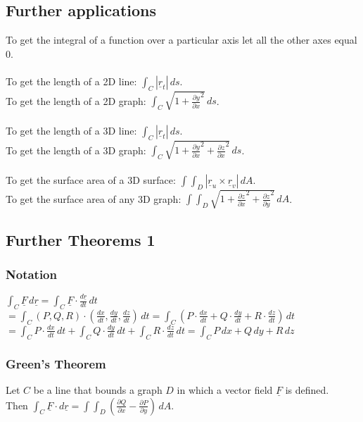 \documentclass{article}
\begin{document}
		\subsection{Further applications}
			To get the integral of a function over a particular axis let all the other axes equal 0. \\
			\\
			To get the length of a 2D line: $\int_C |\underline{r}_{t}| \,ds$. \\
			To get the length of a 2D graph: $\int_C \sqrt{1+\frac{\partial y}{\partial x}^2} \,ds$. \\
			\\
			To get the length of a 3D line: $\int_C |\underline{r}_{t}| \,ds$. \\
			To get the length of a 3D graph: $\int_C \sqrt{1+\frac{\partial y}{\partial x}^2+\frac{\partial z}{\partial x}^2} \,ds$. \\
			\\
			To get the surface area of a 3D surface: $\int\int_D |\underline{r}_{u} \times \underline{r}_{v}| \,dA$. \\
			To get the surface area of any 3D graph: $\int\int_D \sqrt{1+\frac{\partial z}{\partial x}^2+\frac{\partial z}{\partial y}^2} \,dA$. \\
	
	
		\subsection{Further Theorems 1}
	
			\subsubsection{Notation}
				$\int_C \underline{F} \,d\underline{r} = \int_C \underline{F} \cdot \frac{d\underline{r}}{dt} \,dt$ \\
				$=\int_C (P,Q,R) \cdot (\frac{dx}{dt},\frac{dy}{dt},\frac{dz}{dt}) \,dt = \int_C (P \cdot \frac{dx}{dt} + Q \cdot \frac{dy}{dt} + R \cdot \frac{dz}{dt}) \,dt$ \\
				$=\int_C P \cdot \frac{dx}{dt} \,dt + \int_C Q \cdot \frac{dy}{dt} \,dt + \int_C R \cdot \frac{dz}{dt} \,dt = \int_C P \,dx + Q \,dy + R \,dz$ \\
	
			\subsubsection{Green's Theorem}
				Let $C$ be a line that bounds a graph $D$ in which a vector field $\underline{F}$ is defined. \\
				Then $\int_{C} \underline{F} \cdot d\underline{r} = \int\int_{D} (\frac{\partial Q}{\partial x}-\frac{\partial P}{\partial y}) \,dA$. \\
	
\end{document}
